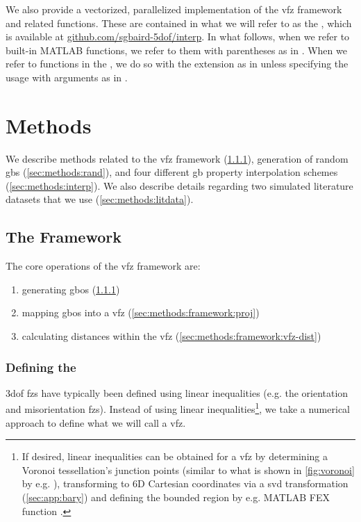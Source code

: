 \documentclass[final,twocolumn,12pt]{elsarticle}
\begin{document}
We also provide a vectorized, parallelized implementation of the \gls{vfz} framework and related functions. These are contained in what we will refer to as the \vfzorepo{}, which is available at \url{github.com/sgbaird-5dof/interp}. In what follows, when we refer to built-in MATLAB functions, we refer to them with parentheses as in . When we refer to functions in the \vfzorepo{}, we do so with the  extension as in  unless specifying the usage with arguments as in .

\section{Methods} \label{sec:methods}

We describe methods related to the \gls{vfz} framework  (\cref{sec:methods:framework:vfz}), generation of random \glspl{gb} (\cref{sec:methods:rand}), and four different \gls{gb} property interpolation schemes (\cref{sec:methods:interp}). We also describe details regarding two simulated literature datasets that we use (\cref{sec:methods:litdata}).

\subsection{The  Framework}
\label{sec:methods:framework}

The core operations of the \gls{vfz} framework are:
\begin{enumerate}
    \item generating \glspl{gbo} (\cref{sec:methods:framework:vfz})
    \item mapping \glspl{gbo} into a \gls{vfz} (\cref{sec:methods:framework:proj})
    \item calculating distances within the \gls{vfz} (\cref{sec:methods:framework:vfz-dist})
\end{enumerate}

\subsubsection{Defining the }
\label{sec:methods:framework:vfz}

\Gls{3dof} \glspl{fz} have typically been defined using linear inequalities (e.g. the orientation \cite{heinzRepresentationOrientationDisorientation1991} and misorientation \cite{grimmerUniqueDescriptionRelative1980,heinzRepresentationOrientationDisorientation1991} \glspl{fz}). Instead of using linear inequalities\footnote{If desired, linear inequalities can be obtained for a \gls{vfz} by determining a Voronoi tessellation's junction points (similar to what is shown in \cref{fig:voronoi} by e.g. ), transforming to 6D Cartesian coordinates via a \gls{svd} transformation (\cref{sec:app:bary}) and defining the bounded region by e.g. MATLAB FEX function .}, we take a numerical approach to define what we will call a \gls{vfz}.
\end{document}
